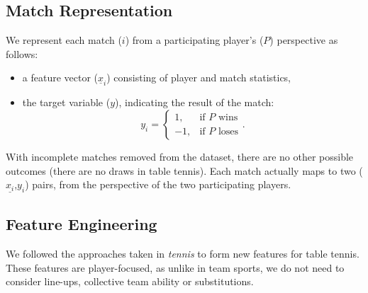 
\subsection{Match Representation}
We represent each match ($i$) from a participating player's ($P$) perspective as follows:
\begin{itemize}
    \item a feature vector ($\underline{x}_i$) consisting of player and  match statistics,
    \item{
     the target variable ($y$), indicating the result of the match: %
     \begin{equation}
        y_i =
        \begin{cases}
        1, &\text{if $P$ wins} \\ 
        -1, &\text{if $P$ loses}
        \end{cases}.
        \label{eq:y}
    \end{equation}
     }
\end{itemize}



With incomplete matches removed from the dataset, there are no other possible outcomes (there are no draws in table tennis). Each match actually maps to two ($\underline{x_i}$,$y_i$) pairs, from the perspective of the two participating players.

\subsection{Feature Engineering}
\label{sec:engineer}
We followed the approaches taken in \textit{tennis}  \cite{barnett2005combining,sipko2015machine,cornman2017machine}  to form new features for table tennis. These features are player-focused, as unlike in team sports, we do not need to consider line-ups, collective team ability or substitutions.

